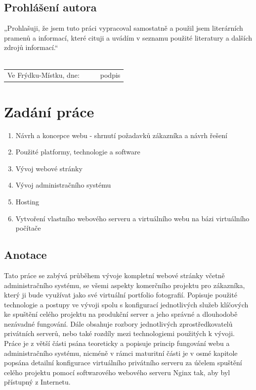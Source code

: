 \documentclass[12pt,a4paper]{report}
\begin{document}
  \section*{Prohlášení autora}
  \color{black}
  \vfill
  „Prohlašuji, že jsem tuto práci vypracoval samostatně a použil jsem literárních pramenů a informací, které cituji a uvádím v seznamu použité literatury a dalších zdrojů informací.“ \\
	\vspace*{0.5cm} \\
	\renewcommand{\arraystretch}{2}
	\begin{tabularx}{\textwidth}{l@{\hskip 0.75cm}X@{\hskip 1.5cm}X@{\hskip 0.75cm}l}
		Ve Frýdku-Místku, dne: & \dotfill & \dotfill & podpis \\
	\end{tabularx}
  
  \clearpage
  \chapter*{Zadání práce}
  \begin{enumerate}
    \item Návrh a koncepce webu - shrnutí požadavků zákazníka a návrh řešení
    \item Použité platformy, technologie a software
    \item Vývoj webové stránky
    \item Vývoj administračního systému
    \item Hosting
    \item Vytvoření vlastního webového serveru a virtuálního webu na bázi virtuálního počítače
  \end{enumerate}
  \clearpage

  \section*{Anotace}
  Tato práce se zabývá průběhem vývoje kompletní webové stránky včetně administračního systému,
  se všemi aspekty komerčního projektu pro zákazníka, který ji bude využívat jako své virtuální portfolio 
  fotografií. Popisuje použité technologie a postupy ve vývoji spolu s konfigurací jednotlivých služeb klíčových ke spuštění celého projektu
  na produkční server a jeho správné a dlouhodobě nezávadné fungování. Dále obsahuje rozbory jednotlivých zprostředkovatelů privátních serverů,
  nebo také rozdíly mezi technologiemi použitých k vývoji. Práce je z větší části psána teoreticky a popisuje princip fungování webu a administračního systému,
  nicméně v rámci maturitní části je v osmé kapitole popsána detailní konfigurace virtuálního privátního serveru
  za účelem spuštění celého projektu pomocí softwarového webového serveru Nginx tak, aby byl přístupný z Internetu.
\end{document}
